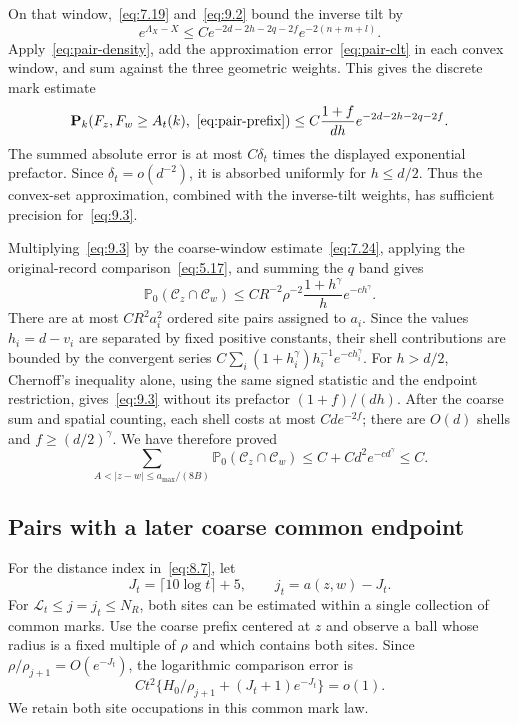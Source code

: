 \documentclass[11pt,letterpaper,reqno]{amsart}
\numberwithin{equation}{section}
\theoremstyle{remark}
\begin{document}
On that window,~\eqref{eq:7.19} and~\eqref{eq:9.2} bound the inverse tilt by
\[
 e^{\Lambda_X-X}\le
 C e^{-2d-2h-2q-2f}e^{-2(n+m+l)}.
\]
Apply~\eqref{eq:pair-density}, add the approximation error~\eqref{eq:pair-clt} in each convex window, and sum against the three geometric weights. This gives the discrete mark estimate
\begin{equation}\label{eq:9.3}
 \mathbf P_k(F_z,F_w\ge A_t(k),\ \eqref{eq:pair-prefix})
 \le C\frac{1+f}{dh}e^{-2d-2h-2q-2f}.
\end{equation}
The summed absolute error is at most $C\delta_t$ times the displayed exponential prefactor. Since $\delta_t=o(d^{-2})$, it is absorbed uniformly for $h\le d/2$. Thus the convex-set approximation, combined with the inverse-tilt weights, has sufficient precision for~\eqref{eq:9.3}.

Multiplying~\eqref{eq:9.3} by the coarse-window estimate~\eqref{eq:7.24}, applying the original-record comparison~\eqref{eq:5.17}, and summing the $q$ band gives
\begin{equation}\label{eq:9.4}
 \mathbb P_0(\mathcal C_z\cap\mathcal C_w)
 \le CR^{-2}\rho^{-2}\frac{1+h^\gamma}{h}e^{-c h^\gamma}.
\end{equation}
There are at most $CR^2a_i^2$ ordered site pairs assigned to $a_i$. Since the values $h_i=d-v_i$ are separated by fixed positive constants, their shell contributions are bounded by the convergent series
$C\sum_i(1+h_i^\gamma)h_i^{-1}e^{-c h_i^\gamma}$.
For $h>d/2$, Chernoff's inequality alone, using the same signed statistic and the endpoint restriction, gives~\eqref{eq:9.3} without its prefactor $(1+f)/(dh)$. After the coarse sum and spatial counting, each shell costs at most $Cd e^{-2f}$; there are $O(d)$ shells and $f\ge(d/2)^\gamma$. We have therefore proved
\begin{equation}\label{eq:9.5}
 \sum_{A<|z-w|\le a_{\max}/(8B)}
 \mathbb P_0(\mathcal C_z\cap\mathcal C_w)
 \le C+Cd^2e^{-c d^\gamma}\le C.
\end{equation}

\subsection{Pairs with a later coarse common endpoint}\label{sec:coarsepairs}
For the distance index in~\eqref{eq:8.7}, let
\begin{equation}\label{eq:9.6}
J_t=\lceil10\log t\rceil+5,\qquad j_t=a(z,w)-J_t.
\end{equation}
For $\mathcal L_t\le j=j_t\le N_R$, both sites can be estimated within a single collection of common marks. Use the coarse prefix centered at $z$ and observe a ball whose radius is a fixed multiple of $\rho$ and which contains both sites. Since $\rho/\rho_{j+1}=O(e^{-J_t})$, the logarithmic comparison error is
\begin{equation}\label{eq:9.7}
Ct^2\{H_0/\rho_{j+1}+(J_t+1)e^{-J_t}\}=o(1).
\end{equation}
We retain both site occupations in this common mark law.
\end{document}
